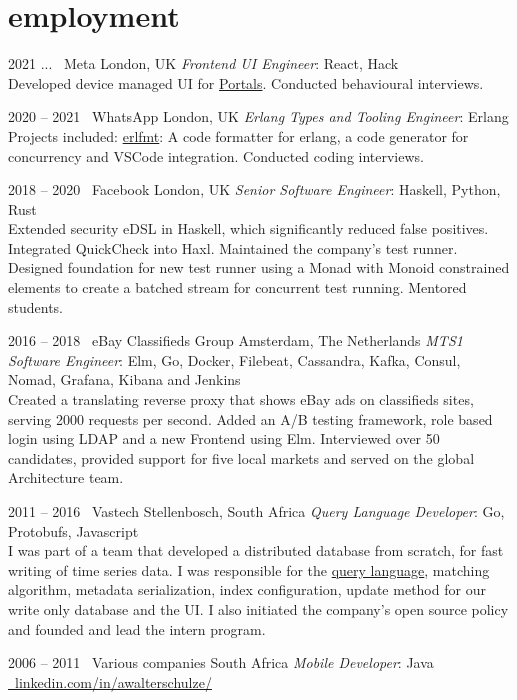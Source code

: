\documentclass[print]{friggeri-cv-a4} %
\begin{document}
\section{employment}
\begin{entrylist}

\entry
{2021 ...}
{\infty\ Meta}
{London, UK}
{\emph{Frontend UI Engineer}: React, Hack \\
Developed device managed UI for \href{https://portal.facebook.com/business/}{Portals}. Conducted behavioural interviews.
}

\entry
{2020 -- 2021}
{\faWhatsapp\ WhatsApp}
{London, UK}
{\emph{Erlang Types and Tooling Engineer}: Erlang \\
Projects included: \href{https://github.com/whatsapp/erlfmt}{erlfmt}: A code formatter for erlang, a code generator for concurrency and VSCode integration. Conducted coding interviews.
}

\entry
{2018 -- 2020}
{\faFacebookSquare\ Facebook}
{London, UK}
{\emph{Senior Software Engineer}: Haskell, Python, Rust \\
Extended security eDSL in Haskell, which significantly reduced false positives. Integrated QuickCheck into Haxl.
Maintained the company's test runner. Designed foundation for new test runner using a Monad with Monoid constrained elements to create a batched stream for concurrent test running.  Mentored students.
}

\entry
{2016 -- 2018}
{\faShoppingBasket\ eBay Classifieds Group}
{Amsterdam, The Netherlands}
{\emph{MTS1 Software Engineer}: Elm, Go, Docker, Filebeat, Cassandra, Kafka, Consul, Nomad, Grafana, Kibana and Jenkins \\
Created a translating reverse proxy that shows eBay ads on classifieds sites, serving 2000 requests per second. Added an A/B testing framework, role based login using LDAP and a new Frontend using Elm. Interviewed over 50 candidates, provided support for five local markets and served on the global Architecture team.
}

\entry
{2011 -- 2016}
{\faHeadphones\ Vastech}
{Stellenbosch, South Africa}
{\emph{Query Language Developer}: Go, Protobufs, Javascript \\
I was part of a team that developed a distributed database from scratch, for fast writing of time series data. I was responsible for the \href{https://github.com/katydid/katydid}{query language}, matching algorithm, metadata serialization, index configuration, update method for our write only database and the UI. I also initiated the company's open source policy and founded and lead the intern program.
}

\entry
{2006 -- 2011}
{\faMobile\ Various companies}
{South Africa}
{\emph{Mobile Developer}: Java \\
\href{https://www.linkedin.com/in/awalterschulze/}{\faLinkedinSquare\ linkedin.com/in/awalterschulze/}
}

\end{entrylist}
\end{document}
